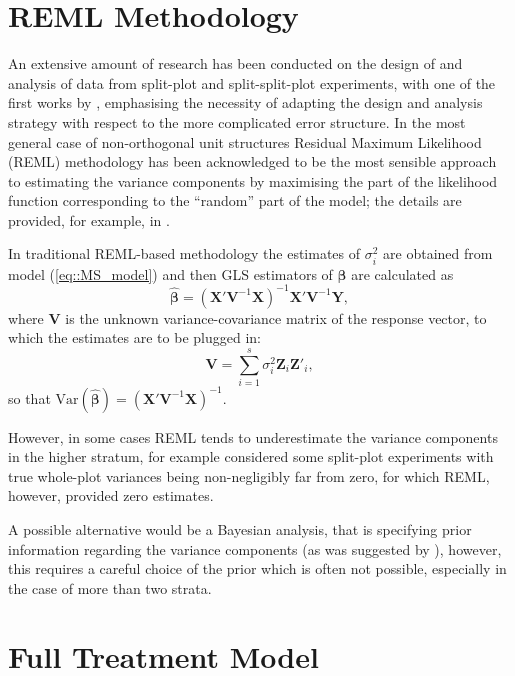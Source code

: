 \section{REML Methodology}
An extensive amount of research has been conducted on the design of and analysis of data from split-plot and split-split-plot experiments, with one of the first works by \cite{Letsinger1996BiRandomization}, emphasising the necessity of adapting the design and analysis strategy with respect to the more complicated error structure.  In the most general case of non-orthogonal unit structures Residual Maximum Likelihood (REML) methodology has been acknowledged to be the most sensible approach to estimating the variance components by maximising the part of the likelihood function corresponding to the ``random'' part of the model; the details are provided, for example, in \cite{Searle2001generalized}. 

In traditional REML-based methodology the estimates of $\sigma^{2}_{i}$ are obtained from model (\ref{eq::MS_model}) and then GLS estimators of $\bm{\beta}$ are calculated as
\begin{equation}
\label{eq::MS_GLS}
\bm{\hat{\beta}}=(\bm{X}'\bm{V}^{-1}\bm{X})^{-1}\bm{X}'\bm{V}^{-1}\bm{Y},
\end{equation}
where $\bm{V}$ is the unknown variance-covariance matrix of the response vector, to which the estimates are to be plugged in:
\begin{equation*}
\bm{V}=\sum_{i=1}^{s}\sigma^{2}_{i}\bm{Z}_{i}\bm{Z}'_{i},
\end{equation*}
so that $\mbox{Var}(\bm{\hat{\beta}})=(\bm{X}'\bm{V}^{-1}\bm{X})^{-1}.$

However, in some cases REML tends to underestimate the variance components in the higher stratum, for example \cite{Goos2006practical} considered some split-plot experiments with true whole-plot variances being non-negligibly far from zero, for which REML, however, provided zero estimates. 

A possible alternative would be a Bayesian analysis, that is specifying prior information regarding the variance components (as was suggested by \cite{Gilmour2009analysis}), however, this requires a careful choice of the prior which is often not possible, especially in the case of more than two strata.

\section{Full Treatment Model}

